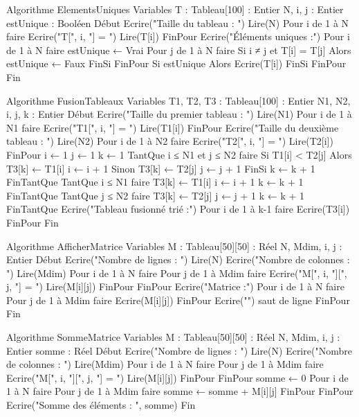\begin{algo}
Algorithme ElementsUniques
Variables
    T : Tableau[100] : Entier
    N, i, j : Entier
    estUnique : Booléen
Début
    Ecrire("Taille du tableau : ")
    Lire(N)
    Pour i de 1 à N faire
        Ecrire("T[", i, "] = ")
        Lire(T[i])
    FinPour
    Ecrire("Éléments uniques :")
    Pour i de 1 à N faire
        estUnique ← Vrai
        Pour j de 1 à N faire
            Si i ≠ j et T[i] = T[j] Alors
                estUnique ← Faux
            FinSi
        FinPour
        Si estUnique Alors
            Ecrire(T[i])
        FinSi
    FinPour
Fin
\end{algo}

\begin{algo}
Algorithme FusionTableaux
Variables
    T1, T2, T3 : Tableau[100] : Entier
    N1, N2, i, j, k : Entier
Début
    Ecrire("Taille du premier tableau : ")
    Lire(N1)
    Pour i de 1 à N1 faire
        Ecrire("T1[", i, "] = ")
        Lire(T1[i])
    FinPour
    Ecrire("Taille du deuxième tableau : ")
    Lire(N2)
    Pour i de 1 à N2 faire
        Ecrire("T2[", i, "] = ")
        Lire(T2[i])
    FinPour
    i ← 1
    j ← 1
    k ← 1
    TantQue i ≤ N1 et j ≤ N2 faire
        Si T1[i] < T2[j] Alors
            T3[k] ← T1[i]
            i ← i + 1
        Sinon
            T3[k] ← T2[j]
            j ← j + 1
        FinSi
        k ← k + 1
    FinTantQue
    TantQue i ≤ N1 faire
        T3[k] ← T1[i]
        i ← i + 1
        k ← k + 1
    FinTantQue
    TantQue j ≤ N2 faire
        T3[k] ← T2[j]
        j ← j + 1
        k ← k + 1
    FinTantQue
    Ecrire("Tableau fusionné trié :")
    Pour i de 1 à k-1 faire
        Ecrire(T3[i])
    FinPour
Fin
\end{algo}

\begin{algo}
Algorithme AfficherMatrice
Variables
    M : Tableau[50][50] : Réel
    N, Mdim, i, j : Entier
Début
    Ecrire("Nombre de lignes : ")
    Lire(N)
    Ecrire("Nombre de colonnes : ")
    Lire(Mdim)
    Pour i de 1 à N faire
        Pour j de 1 à Mdim faire
            Ecrire("M[", i, "][", j, "] = ")
            Lire(M[i][j])
        FinPour
    FinPour
    Ecrire("Matrice :")
    Pour i de 1 à N faire
        Pour j de 1 à Mdim faire
            Ecrire(M[i][j])
        FinPour
        Ecrire("")  {saut de ligne}
    FinPour
Fin
\end{algo}

\begin{algo}
Algorithme SommeMatrice
Variables
    M : Tableau[50][50] : Réel
    N, Mdim, i, j : Entier
    somme : Réel
Début
    Ecrire("Nombre de lignes : ")
    Lire(N)
    Ecrire("Nombre de colonnes : ")
    Lire(Mdim)
    Pour i de 1 à N faire
        Pour j de 1 à Mdim faire
            Ecrire("M[", i, "][", j, "] = ")
            Lire(M[i][j])
        FinPour
    FinPour
    somme ← 0
    Pour i de 1 à N faire
        Pour j de 1 à Mdim faire
            somme ← somme + M[i][j]
        FinPour
    FinPour
    Ecrire("Somme des éléments : ", somme)
Fin
\end{algo}

